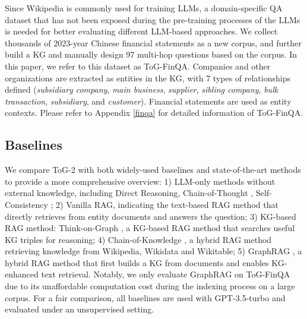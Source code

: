 \documentclass{article} %
\begin{document}
Since Wikipedia is commonly used for training LLMs, a domain-specific QA dataset that has not been exposed during the pre-training processes of the LLMs is needed for better evaluating different LLM-based approaches. We collect thousands of 2023-year Chinese financial statements as a new corpus, and further build a KG and manually design 97 multi-hop questions based on the corpus. In this paper, we refer to this dataset as ToG-FinQA. 
Companies and other organizations are extracted as entities in the KG, with 7 types of relationships defined (\textit{subsidiary company}, \textit{main business}, \textit{supplier}, \textit{sibling company}, \textit{bulk transaction}, \textit{subsidiary}, and \textit{customer}). 
Financial statements are used as entity contexts. Please refer to Appendix \ref{finqa} for detailed information of ToG-FinQA.

\subsection{Baselines}
We compare ToG-2 with both widely-used baselines and state-of-the-art methods to provide a more comprehensive overview: 1) LLM-only methods without external knowledge, including Direct Reasoning, Chain-of-Thought \citep{wei2022chain}, Self-Consistency \citep{wang2023selfconsistencyimproveschainthought}; 2) Vanilla RAG, indicating the text-based RAG method that directly retrieves from entity documents and answers the question; 3) KG-based RAG method: Think-on-Graph \citep{sun2024thinkongraphdeepresponsiblereasoning}, a KG-based RAG method that searches useful KG triples for reasoning; 4) Chain-of-Knowledge \citep{li2024cok}, a hybrid RAG method retrieving knowledge from Wikipedia, Wikidata and Wikitable; 5) GraphRAG \citep{edge2024localglobalgraphrag}, a hybrid RAG method that first builds a KG from documents and enables KG-enhanced text retrieval. Notably, we only evaluate GraphRAG on ToG-FinQA due to its unaffordable computation cost during the indexing process on a large corpus. For a fair comparison, all baselines are used with GPT-3.5-turbo and evaluated under an unsupervised setting.
\end{document}
